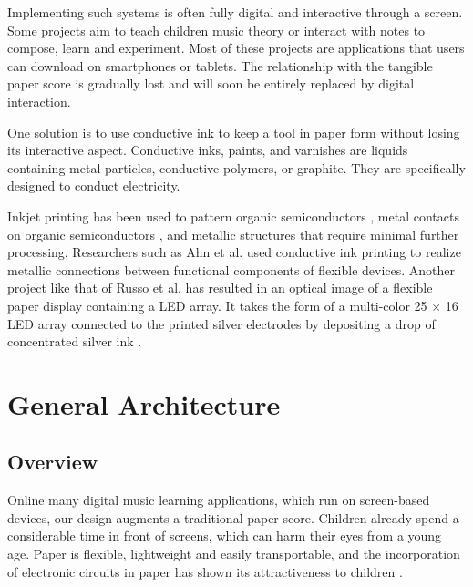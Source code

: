 Implementing such systems is often fully digital and interactive through a screen. Some projects aim to teach children music theory or interact with notes to compose, learn and experiment. Most of these projects are applications that users can download on smartphones or tablets. The relationship with the tangible paper score is gradually lost and will soon be entirely replaced by digital interaction.

One solution is to use conductive ink to keep a tool in paper form without losing its interactive aspect. Conductive inks, paints, and varnishes are liquids containing metal particles, conductive polymers, or graphite. They are specifically designed to conduct electricity.

Inkjet printing has been used to pattern organic semiconductors \cite{kim2008heterogeneous}, metal contacts on organic semiconductors \cite{khan2019soft} \cite{wessely2020sprayable}, and metallic structures that require minimal further processing. Researchers such as Ahn et al. used conductive ink printing to realize metallic connections between functional components of flexible devices. Another project like that of Russo et al. has resulted in an optical image of a flexible paper display containing a LED array. It takes the form of a multi-color 25 × 16 LED array connected to the printed silver electrodes by depositing a drop of concentrated silver ink \cite{russo2011pen}.

\section{General Architecture}

\subsection{Overview}

Online many digital music learning applications, which run on screen-based devices,
our design augments a traditional paper score. Children already spend a considerable
time in front of screens, which can harm their eyes from a young age. Paper is flexible,
lightweight and easily transportable, and the incorporation of electronic circuits in
paper has shown its attractiveness to children
\cite{hershman2018light}.

